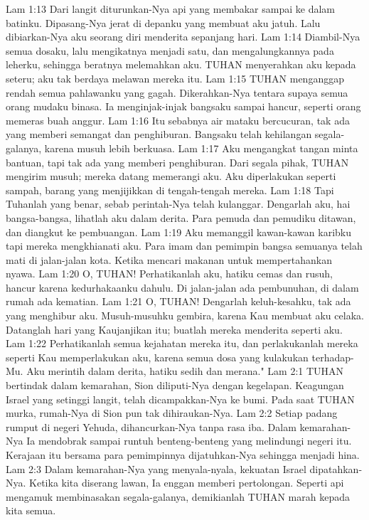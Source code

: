 Lam 1:13  Dari langit diturunkan-Nya api yang membakar sampai ke dalam batinku. Dipasang-Nya jerat di depanku yang membuat aku jatuh. Lalu dibiarkan-Nya aku seorang diri menderita sepanjang hari.
Lam 1:14  Diambil-Nya semua dosaku, lalu mengikatnya menjadi satu, dan mengalungkannya pada leherku, sehingga beratnya melemahkan aku. TUHAN menyerahkan aku kepada seteru; aku tak berdaya melawan mereka itu.
Lam 1:15  TUHAN menganggap rendah semua pahlawanku yang gagah. Dikerahkan-Nya tentara supaya semua orang mudaku binasa. Ia menginjak-injak bangsaku sampai hancur, seperti orang memeras buah anggur.
Lam 1:16  Itu sebabnya air mataku bercucuran, tak ada yang memberi semangat dan penghiburan. Bangsaku telah kehilangan segala-galanya, karena musuh lebih berkuasa.
Lam 1:17  Aku mengangkat tangan minta bantuan, tapi tak ada yang memberi penghiburan. Dari segala pihak, TUHAN mengirim musuh; mereka datang memerangi aku. Aku diperlakukan seperti sampah, barang yang menjijikkan di tengah-tengah mereka.
Lam 1:18  Tapi Tuhanlah yang benar, sebab perintah-Nya telah kulanggar. Dengarlah aku, hai bangsa-bangsa, lihatlah aku dalam derita. Para pemuda dan pemudiku ditawan, dan diangkut ke pembuangan.
Lam 1:19  Aku memanggil kawan-kawan karibku tapi mereka mengkhianati aku. Para imam dan pemimpin bangsa semuanya telah mati di jalan-jalan kota. Ketika mencari makanan untuk mempertahankan nyawa.
Lam 1:20  O, TUHAN! Perhatikanlah aku, hatiku cemas dan rusuh, hancur karena kedurhakaanku dahulu. Di jalan-jalan ada pembunuhan, di dalam rumah ada kematian.
Lam 1:21  O, TUHAN! Dengarlah keluh-kesahku, tak ada yang menghibur aku. Musuh-musuhku gembira, karena Kau membuat aku celaka. Datanglah hari yang Kaujanjikan itu; buatlah mereka menderita seperti aku.
Lam 1:22  Perhatikanlah semua kejahatan mereka itu, dan perlakukanlah mereka seperti Kau memperlakukan aku, karena semua dosa yang kulakukan terhadap-Mu. Aku merintih dalam derita, hatiku sedih dan merana."
Lam 2:1  TUHAN bertindak dalam kemarahan, Sion diliputi-Nya dengan kegelapan. Keagungan Israel yang setinggi langit, telah dicampakkan-Nya ke bumi. Pada saat TUHAN murka, rumah-Nya di Sion pun tak dihiraukan-Nya.
Lam 2:2  Setiap padang rumput di negeri Yehuda, dihancurkan-Nya tanpa rasa iba. Dalam kemarahan-Nya Ia mendobrak sampai runtuh benteng-benteng yang melindungi negeri itu. Kerajaan itu bersama para pemimpinnya dijatuhkan-Nya sehingga menjadi hina.
Lam 2:3  Dalam kemarahan-Nya yang menyala-nyala, kekuatan Israel dipatahkan-Nya. Ketika kita diserang lawan, Ia enggan memberi pertolongan. Seperti api mengamuk membinasakan segala-galanya, demikianlah TUHAN marah kepada kita semua.
